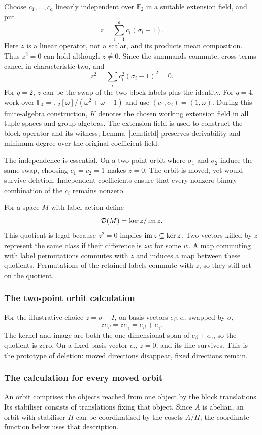 \documentclass[11pt,a4paper]{article}
\theoremstyle{definition}\newtheorem{definition}[theorem]{Definition}
\theoremstyle{remark}\newtheorem{remark}[theorem]{Remark}
\newcommand{\Ftwo}{\mathbb F_2}
\newcommand{\D}{\mathcal D}\newcommand{\Del}{\mathcal D}\newcommand{\Lift}{\mathsf L}
\begin{document}
Choose $c_1,\ldots,c_a$ linearly independent over $\Ftwo$ in a suitable extension field, and put
\begin{equation}\label{eq:z2}z=\sum_{i=1}^ac_i(\sigma_i-1).\end{equation}
Here $z$ is a linear operator, not a scalar, and its products mean composition. Thus $z^2=0$ can hold although $z\ne0$. Since the summands commute, cross terms cancel in characteristic two, and
\[z^2=\sum_i c_i^2(\sigma_i-1)^2=0.\]
For $q=2$, $z$ can be the swap of the two block labels plus the identity. For $q=4$, work over $\mathbb F_4=\Ftwo[\omega]/(\omega^2+\omega+1)$ and use $(c_1,c_2)=(1,\omega)$.
During this finite-algebra construction, $K$ denotes the chosen
working extension field in all tuple spaces and group algebras.
The extension field is used to construct the block operator and its
witness; Lemma~\ref{lem:field} preserves derivability and minimum
degree over the original coefficient field.

The independence is essential. On a two-point orbit where $\sigma_1$ and $\sigma_2$ induce the same swap, choosing $c_1=c_2=1$ makes $z=0$. The orbit is moved, yet would survive deletion. Independent coefficients ensure that every nonzero binary combination of the $c_i$ remains nonzero.

For a space $M$ with label action define
\begin{equation}\label{eq:D2}\D(M)=\ker z/\im z.\end{equation}
This quotient is legal because $z^2=0$ implies $\operatorname{im} z\subseteq\ker z$. Two vectors killed by $z$ represent the same class if their difference is $zw$ for some $w$. A map commuting with label permutations commutes with $z$ and induces a map between these quotients. Permutations of the retained labels commute with $z$, so they still act on the quotient.

\subsubsection{The two-point orbit calculation}
For the illustrative choice $z=\sigma-I$, on basis vectors $e_\beta,e_\gamma$ swapped by $\sigma$,
\[ze_\beta=ze_\gamma=e_\beta+e_\gamma.\]
The kernel and image are both the one-dimensional span of $e_\beta+e_\gamma$, so the quotient is zero. On a fixed basis vector $e_i$, $z=0$, and its line survives. This is the prototype of deletion: moved directions disappear, fixed directions remain.

\subsubsection{The calculation for every moved orbit}
An orbit comprises the objects reached from one object by the block
translations. Its stabiliser consists of translations fixing that
object. Since $A$ is abelian, an orbit with stabiliser $H$ can be
coordinatised by the cosets $A/H$; the coordinate function below uses
that description.
\end{document}
